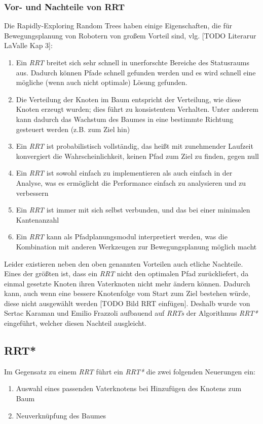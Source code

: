 \subsubsection{Vor- und Nachteile von RRT}
Die Rapidly-Exploring Random Trees haben einige Eigenschaften, die für Bewegungsplanung von Robotern von großem Vorteil sind, vlg. [TODO Literarur LaValle Kap 3]:
\begin{enumerate}
\item Ein \textit{RRT} breitet sich sehr schnell in unerforschte Bereiche des Statusraums aus. Dadurch können Pfade schnell gefunden werden und es wird schnell eine mögliche (wenn auch nicht optimale) Lösung gefunden.
\item Die Verteilung der Knoten im Baum entspricht der Verteilung, wie diese Knoten erzeugt wurden; dies führt zu konsistentem Verhalten. Unter anderem kann dadurch das Wachstum des Baumes in eine bestimmte Richtung gesteuert werden (z.B. zum Ziel hin)
\item Ein \textit{RRT} ist probabilistisch vollständig, das heißt mit zunehmender Laufzeit konvergiert die Wahrscheinlichkeit, keinen Pfad zum Ziel zu finden, gegen null
\item Ein \textit{RRT} ist sowohl einfach zu implementieren als auch einfach in der Analyse, was es ermöglicht die Performance einfach zu analysieren und zu verbessern
\item Ein \textit{RRT} ist immer mit sich selbst verbunden, und das bei einer minimalen Kantenanzahl
\item Ein \textit{RRT} kann als Pfadplanungsmodul interpretiert werden, was die Kombination mit anderen Werkzeugen zur Bewegungsplanung möglich macht
\end{enumerate}
Leider existieren neben den oben genannten Vorteilen auch etliche Nachteile. Eines der größten ist, dass ein \textit{RRT} nicht den optimalen Pfad zurückliefert, da einmal gesetzte Knoten ihren Vaterknoten nicht mehr ändern können. Dadurch kann, auch wenn eine bessere Knotenfolge vom Start zum Ziel bestehen würde, diese nicht ausgewählt werden [TODO Bild RRT einfügen]. Deshalb wurde von Sertac Karaman und Emilio Frazzoli aufbauend auf \textit{RRTs} der Algorithmus\textit{ RRT*} eingeführt, welcher diesen Nachteil ausgleicht.
\subsection{RRT*}
Im Gegensatz zu einem \textit{RRT} führt ein \textit{RRT*} die zwei folgenden Neuerungen ein:
\begin{enumerate}
\item Auswahl eines passenden Vaterknotens bei Hinzufügen des Knotens zum Baum
\item Neuverknüpfung des Baumes
\end{enumerate}

